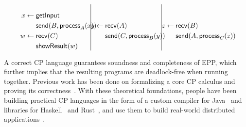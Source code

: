 \[
\begin{minipage}{.3\textwidth}
  \begin{equation*}
    \begin{split}
      x \leftarrow \; & \mathsf{getInput} \\
                      & \mathsf{send}(B, \mathsf{process}_A(x)) \\
      w \leftarrow \; & \mathsf{recv}(C) \\
                      & \mathsf{showResult}(w)
    \end{split}
  \end{equation*}
\end{minipage}
\hfill\vline\hfill
\begin{minipage}{.3\textwidth}
  \begin{equation*}
    \begin{split}
      y \leftarrow \; & \mathsf{recv}(A) \\
                      & \mathsf{send}(C, \mathsf{process}_B(y)) \\
    \end{split}
  \end{equation*}
\end{minipage}
\hfill\vline\hfill
\begin{minipage}{.3\textwidth}
  \begin{equation*}
    \begin{split}
      z \leftarrow \; & \mathsf{recv}(B) \\
                      & \mathsf{send}(A, \mathsf{process}_C(z)) \\
    \end{split}
  \end{equation*}
\end{minipage}
\]

A correct CP language guarantees soundness and completeness of EPP, which further implies that the resulting programs are deadlock-free when running together.
%
Previous work has been done on formalizing a core CP calculus and proving its correctness~\citep{cruzfilipe-2020, cruzfilipe-2022, hirsch-2022}.
%
With these theoretical foundations, people have been building practical CP languages in the form of a custom compiler for Java~\citep{giallorenzo-2024} and libraries for Haskell~\citep{shen-2023} and Rust~\citep{kashiwa-2023}, and use them to build real-world distributed applications~\citep{lugovic-2023}.

